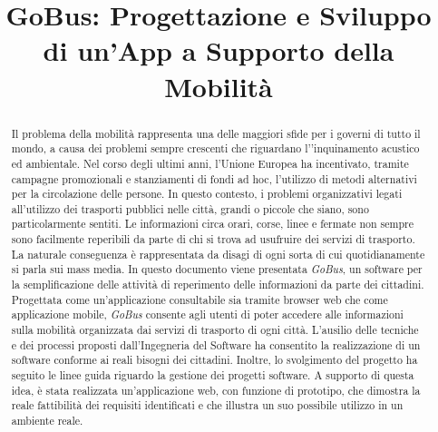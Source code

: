 \documentclass[conference]{IEEEtran}
\begin{document}
\title{GoBus: Progettazione e Sviluppo di un\rq App a Supporto della Mobilit\`{a}}

\author{}


\maketitle


\begin{abstract}
Il problema della mobilit\`{a} rappresenta una delle maggiori sfide per i governi di tutto il mondo, a causa dei problemi sempre crescenti che riguardano l'\rq inquinamento acustico ed ambientale. Nel corso degli ultimi anni, l\rq Unione Europea ha incentivato, tramite campagne promozionali e stanziamenti di fondi ad hoc, l\rq utilizzo di metodi alternativi per la circolazione delle persone. In questo contesto, i problemi organizzativi legati all\rq utilizzo dei trasporti pubblici nelle citt\`{a}, grandi o piccole che siano, sono particolarmente sentiti. Le informazioni circa orari, corse, linee e fermate non sempre sono facilmente reperibili da parte di chi si trova ad usufruire dei servizi di trasporto. La naturale conseguenza \`{e} rappresentata da disagi di ogni sorta di cui quotidianamente si parla sui mass media. In questo documento viene presentata \emph{GoBus}, un software per la semplificazione delle attivit\`{a} di reperimento delle informazioni da parte dei cittadini. Progettata come un\rq applicazione consultabile sia tramite browser web che come applicazione mobile, \emph{GoBus} consente agli utenti di poter accedere alle informazioni sulla mobilit\`{a} organizzata dai servizi di trasporto di ogni citt\`{a}. L\rq ausilio delle tecniche e dei processi proposti dall\rq Ingegneria del Software ha consentito la realizzazione di un software conforme ai reali bisogni dei cittadini. Inoltre, lo svolgimento del progetto ha seguito le linee guida riguardo la gestione dei progetti software. A supporto di questa idea, \`{e} stata realizzata un\rq applicazione web, con funzione di prototipo, che dimostra la reale fattibilit\`{a} dei requisiti identificati e che illustra un suo possibile utilizzo in un ambiente reale.
\end{abstract}
\end{document}
